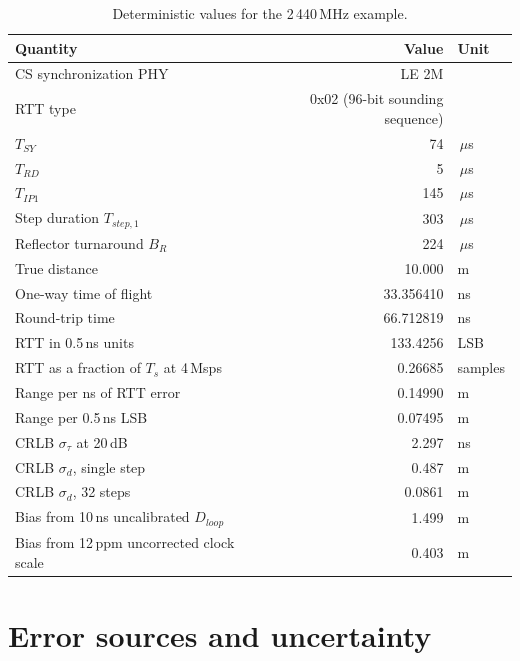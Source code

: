 \documentclass[11pt,a4paper]{article}
\newcommand{\us}{\,\ensuremath{\upmu}s}
\newcommand{\Tsy}{T_{SY}}
\newcommand{\Trd}{T_{RD}}
\newcommand{\Tip}{T_{IP1}}
\providecommand{\upmu}{\mu}
\begin{document}
\begin{table}[h]
\caption{Deterministic values for the 2\,440\,MHz example.}
\label{tab:exvalues}
\centering\small
\begin{tabular}{@{}L{60mm}rl@{}}
\toprule
Quantity & Value & Unit \\
\midrule
CS synchronization PHY & LE 2M & \\
RTT type & 0x02 (96-bit sounding sequence) & \\
$\Tsy$ & 74 & \us \\
$\Trd$ & 5 & \us \\
$\Tip$ & 145 & \us \\
Step duration $T_{step,1}$ & 303 & \us \\
Reflector turnaround $B_R$ & 224 & \us \\
True distance & 10.000 & m \\
One-way time of flight & 33.356410 & ns \\
Round-trip time & 66.712819 & ns \\
RTT in 0.5\,ns units & 133.4256 & LSB \\
RTT as a fraction of $T_s$ at 4\,Msps & 0.26685 & samples \\
Range per ns of RTT error & 0.14990 & m \\
Range per 0.5\,ns LSB & 0.07495 & m \\
CRLB $\sigma_\tau$ at 20\,dB & 2.297 & ns \\
CRLB $\sigma_d$, single step & 0.487 & m \\
CRLB $\sigma_d$, 32 steps & 0.0861 & m \\
Bias from 10\,ns uncalibrated $D_{loop}$ & 1.499 & m \\
Bias from 12\,ppm uncorrected clock scale & 0.403 & m \\
\bottomrule
\end{tabular}
\end{table}

\section{Error sources and uncertainty}
\end{document}

